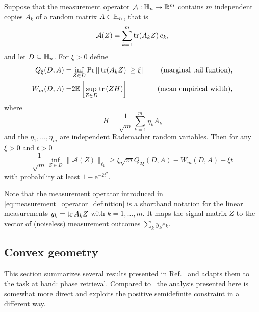 \begin{theorem} \label{thm:mendelson}
  Suppose that the measurement operator $\mathcal{A}:\mathbb{H}_n \to \mathbb{R}^m$ contains $m$ independent copies $A_k$ of a random matrix $A \in \mathbb{H}_n$, that is
  \[
    \label{eq:measurement_operator_definition}
    \mathcal{A}(Z) = \sum_{k=1}^m \operatorname{tr} (A_k Z) \,  e_k,
  \]
  and let $D \subseteq \mathbb{H}_n$.
  For $\xi >0$ define
  \begin{align}
    Q_\xi (D, A) =& \inf_{Z \in D}\mathrm{Pr} \left[ | \operatorname{tr} (A_k Z) | \geq \xi \right] \quad &\textrm{(marginal tail funtion)}, \label{eq:marginal_tail_function}\\
    W_m (D, A) =& 2 \mathbb{E} \left[ \sup_{Z \in D} \operatorname{tr} \left( Z H \right) \right] \quad &\textrm{(mean empirical width)},
  \end{align}
  where
  \[
    H= \frac{1}{\sqrt{m}} \sum_{k=1}^m \eta_k A_k
  \]
  and the $\eta_1,\ldots,\eta_m$ are independent Rademacher random variables.
  Then for any $\xi >0$ and $t >0$
  \[
    \frac{1}{\sqrt{m}}\inf_{Z \in D} \| \mathcal{A}(Z) \|_{\ell_1} \geq \xi \sqrt{m} Q_{2\xi}(D, A) -  W_m (D, A)-\xi t \label{eq:mendelson}
  \]
  with probability at least $1-\mathrm{e}^{-2t^2}$.
\end{theorem}

Note that the measurement operator introduced in \cref{eq:measurement_operator_definition} is a shorthand notation for the linear measurements $y_k = \operatorname{tr} A_k Z$ with $k=1,\ldots,m$.
It maps the signal matrix $Z$ to the vector of (noiseless) measurement outcomes $\sum_k y_k  e_k$.


\subsection{Convex geometry}

This section summarizes several results presented in Ref.~\cite{Kabanava_2015_Stable} and adapts them to the task at hand: phase retrieval.
Compared to~\cite{Kabanava_2015_Stable} the analysis presented here is somewhat more direct and exploits the positive semidefinite constraint in a different way.


